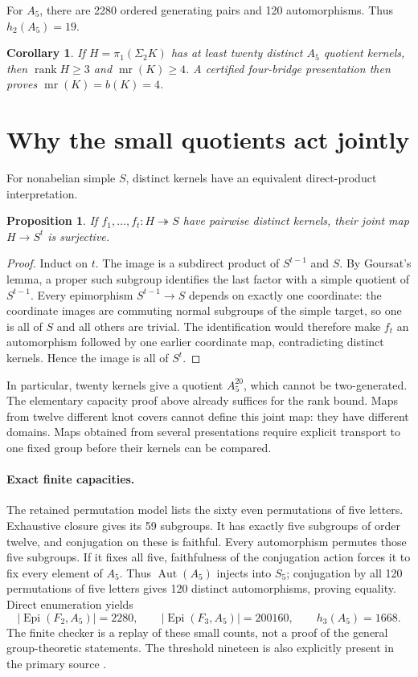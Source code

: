 \documentclass[11pt]{article}
\newtheorem{proposition}[theorem]{Proposition}
\newtheorem{corollary}[theorem]{Corollary}
\newcommand{\mr}{\operatorname{mr}}
\newcommand{\rk}{\operatorname{rank}}
\newcommand{\Epi}{\operatorname{Epi}}
\newcommand{\Aut}{\operatorname{Aut}}
\begin{document}
For $A_5$, there are 2280 ordered generating pairs and 120
automorphisms. Thus $h_2(A_5)=19$.
\begin{corollary}\label{cor:twenty}
If $H=\pi_1(\Sigma_2K)$ has at least twenty distinct $A_5$ quotient
kernels, then $\rk H\ge3$ and $\mr(K)\ge4$. A certified four-bridge
presentation then proves $\mr(K)=b(K)=4$.
\end{corollary}

\section{Why the small quotients act jointly}

For nonabelian simple $S$, distinct kernels have an equivalent
direct-product interpretation.
\begin{proposition}
If $f_1,\ldots,f_t:H\twoheadrightarrow S$ have pairwise distinct
kernels, their joint map $H\to S^t$ is surjective.
\end{proposition}
\begin{proof}
Induct on $t$. The image is a subdirect product of $S^{t-1}$ and $S$.
By Goursat's lemma, a proper such subgroup identifies the last factor
with a simple quotient of $S^{t-1}$. Every epimorphism
$S^{t-1}\to S$ depends on exactly one coordinate: the coordinate images
are commuting normal subgroups of the simple target, so one is all of
$S$ and all others are trivial. The identification would therefore
make $f_t$ an automorphism followed by one earlier coordinate map,
contradicting distinct kernels. Hence the image is all of $S^t$.
\end{proof}

In particular, twenty kernels give a quotient $A_5^{20}$, which cannot
be two-generated. The elementary capacity proof above already suffices
for the rank bound. Maps from twelve different knot covers cannot
define this joint map: they have different domains. Maps obtained
from several presentations require explicit transport to one fixed
group before their kernels can be compared.

\paragraph{Exact finite capacities.}
The retained permutation model lists the sixty even permutations of
five letters. Exhaustive closure gives its 59 subgroups. It has exactly
five subgroups of order twelve, and conjugation on these is faithful.
Every automorphism permutes those five subgroups. If it fixes all five,
faithfulness of the conjugation action forces it to fix every element
of $A_5$. Thus $\Aut(A_5)$ injects into $S_5$; conjugation by all 120
permutations of five letters gives 120 distinct automorphisms, proving
equality. Direct enumeration yields
\[
 |\Epi(F_2,A_5)|=2280,\qquad |\Epi(F_3,A_5)|=200160,
 \qquad h_3(A_5)=1668.
\]
The finite checker is a replay of these small counts, not a proof of
the general group-theoretic statements. The threshold nineteen is
also explicitly present in the primary source \cite{bc}.
\end{document}
